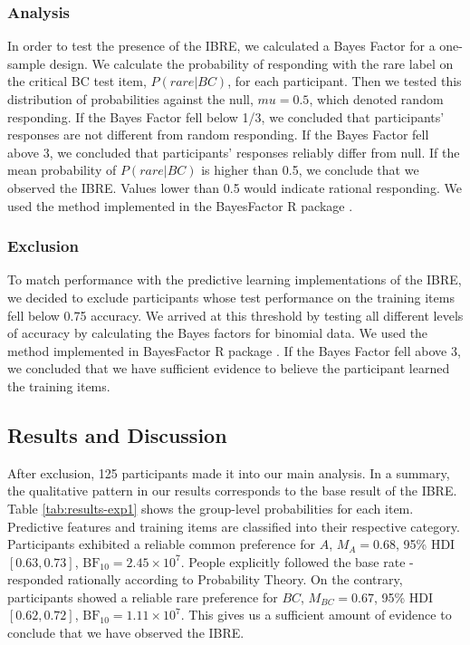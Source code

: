 \documentclass[10pt,letterpaper]{article}
\begin{document}
\subsubsection{Analysis}

In order to test the presence of the IBRE, we calculated a Bayes Factor for a one-sample design.
We calculate the probability of responding with the rare label on the critical BC test item, $P(rare|BC)$, for each participant.
Then we tested this distribution of probabilities against the null, $mu = 0.5$, which denoted random responding.
If the Bayes Factor fell below 1/3, we concluded that participants' responses are not different from random responding.
If the Bayes Factor fell above 3, we concluded that participants' responses reliably differ from null.
If the mean probability of $P(rare|BC)$ is higher than 0.5, we conclude that we observed the IBRE.
Values lower than 0.5 would indicate rational responding.
We used the method implemented in the BayesFactor R package \cite{morey2022bayes}.

\subsubsection{Exclusion}

To match performance with the predictive learning implementations of the IBRE, we decided to exclude participants whose test performance on the training items fell below 0.75 accuracy.
We arrived at this threshold by testing all different levels of accuracy by calculating the Bayes factors for binomial data.
We used the method implemented in BayesFactor R package \cite{morey2022bayes}.
If the Bayes Factor fell above 3, we concluded that we have sufficient evidence to believe the participant learned the training items.

\subsection{Results and Discussion}

After exclusion, 125 participants made it into our main analysis.
In a summary, the qualitative pattern in our results corresponds to the base result of the IBRE.
Table \ref*{tab:results-exp1} shows the group-level probabilities for each item.
Predictive features and training items are classified into their respective category.
Participants exhibited a reliable common preference for $A$, $M_{A} = 0.68$, 95\% HDI $[0.63, 0.73]$, $\mathrm{BF}_{10} = 2.45 \times 10^{7}$.
People explicitly followed the base rate  - responded rationally according to Probability Theory.
On the contrary, participants showed a reliable rare preference for $BC$, $M_{BC} = 0.67$, 95\% HDI $[0.62, 0.72]$, $\mathrm{BF}_{10} = 1.11 \times 10^{7}$.
This gives us a sufficient amount of evidence to conclude that we have observed the IBRE.
\end{document}
